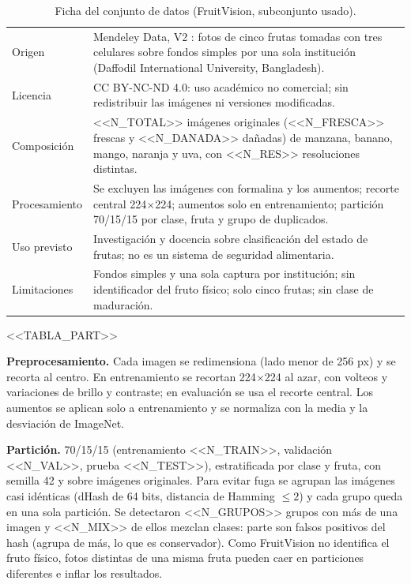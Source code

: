 \documentclass[10pt,twocolumn,letterpaper]{article}
\begin{document}
\begin{table}[t]\centering\footnotesize{}\caption{Ficha del conjunto de datos (FruitVision, subconjunto usado).}\label{tab:ficha}
\begin{tabular}{@{}p{2.4cm}p{14.8cm}@{}}\toprule
Origen & Mendeley Data, V2 \cite{fv}: fotos de cinco frutas tomadas con tres celulares sobre fondos simples por una sola institución (Daffodil International University, Bangladesh). \\
Licencia & CC BY-NC-ND 4.0: uso académico no comercial; sin redistribuir las imágenes ni versiones modificadas. \\
Composición & <<N_TOTAL>> imágenes originales (<<N_FRESCA>> frescas y <<N_DANADA>> dañadas) de manzana, banano, mango, naranja y uva, con <<N_RES>> resoluciones distintas. \\
Procesamiento & Se excluyen las imágenes con formalina y los aumentos; recorte central 224$\times$224; aumentos solo en entrenamiento; partición 70/15/15 por clase, fruta y grupo de duplicados. \\
Uso previsto & Investigación y docencia sobre clasificación del estado de frutas; no es un sistema de seguridad alimentaria. \\
Limitaciones & Fondos simples y una sola captura por institución; sin identificador del fruto físico; solo cinco frutas; sin clase de maduración. \\
\bottomrule\end{tabular}\end{table}

\begin{table}[t]\centering\footnotesize{}\caption{Imágenes por partición y clase.}\label{tab:part}
\setlength{\tabcolsep}{3pt}<<TABLA_PART>>\end{table}

\textbf{Preprocesamiento.} Cada imagen se redimensiona (lado menor de 256 px) y se recorta al centro. En entrenamiento se recortan 224$\times$224 al azar, con volteos y variaciones de brillo y contraste; en evaluación se usa el recorte central. Los aumentos se aplican solo a entrenamiento y se normaliza con la media y la desviación de ImageNet.

\textbf{Partición.} 70/15/15 (entrenamiento <<N_TRAIN>>, validación <<N_VAL>>, prueba <<N_TEST>>), estratificada por clase y fruta, con semilla 42 y sobre imágenes originales. Para evitar fuga se agrupan las imágenes casi idénticas (dHash de 64 bits, distancia de Hamming $\leq 2$) y cada grupo queda en una sola partición. Se detectaron <<N_GRUPOS>> grupos con más de una imagen y <<N_MIX>> de ellos mezclan clases: parte son falsos positivos del hash (agrupa de más, lo que es conservador). Como FruitVision no identifica el fruto físico, fotos distintas de una misma fruta pueden caer en particiones diferentes e inflar los resultados.
\end{document}
